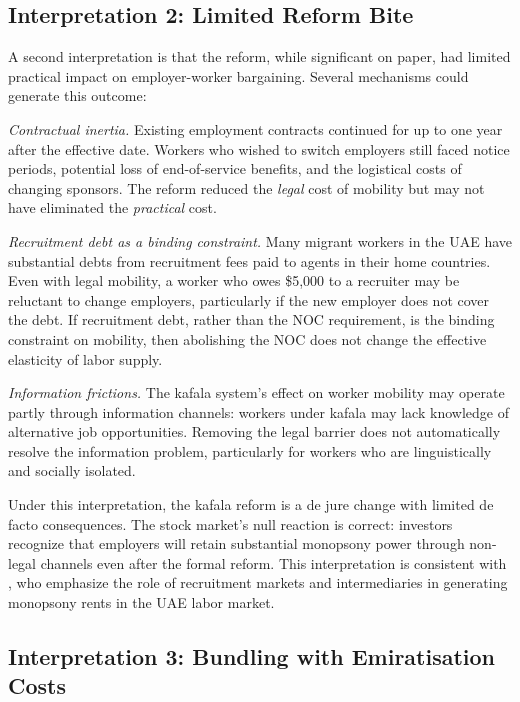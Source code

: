 \documentclass[12pt]{article}
\begin{document}
\subsection{Interpretation 2: Limited Reform Bite}

A second interpretation is that the reform, while significant on paper, had limited practical impact on employer-worker bargaining. Several mechanisms could generate this outcome:

\textit{Contractual inertia.} Existing employment contracts continued for up to one year after the effective date. Workers who wished to switch employers still faced notice periods, potential loss of end-of-service benefits, and the logistical costs of changing sponsors. The reform reduced the \emph{legal} cost of mobility but may not have eliminated the \emph{practical} cost.

\textit{Recruitment debt as a binding constraint.} Many migrant workers in the UAE have substantial debts from recruitment fees paid to agents in their home countries. Even with legal mobility, a worker who owes \$5,000 to a recruiter may be reluctant to change employers, particularly if the new employer does not cover the debt. If recruitment debt, rather than the NOC requirement, is the binding constraint on mobility, then abolishing the NOC does not change the effective elasticity of labor supply.

\textit{Information frictions.} The kafala system's effect on worker mobility may operate partly through information channels: workers under kafala may lack knowledge of alternative job opportunities. Removing the legal barrier does not automatically resolve the information problem, particularly for workers who are linguistically and socially isolated.

Under this interpretation, the kafala reform is a de jure change with limited de facto consequences. The stock market's null reaction is correct: investors recognize that employers will retain substantial monopsony power through non-legal channels even after the formal reform. This interpretation is consistent with \citet{naidu2016monopsony2}, who emphasize the role of recruitment markets and intermediaries in generating monopsony rents in the UAE labor market.

\subsection{Interpretation 3: Bundling with Emiratisation Costs}
\end{document}
